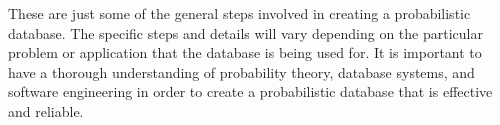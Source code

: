 \vspace{5cm}

These are just some of the general steps involved in creating a probabilistic database. The specific steps and details will vary depending on the particular problem or application that the database is being used for. It is important to have a thorough understanding of probability theory, database systems, and software engineering in order to create a probabilistic database that is effective and reliable.